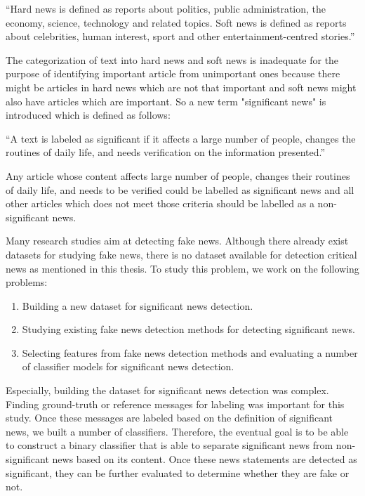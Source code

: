 \enquote{Hard news is defined as reports about politics, public administration, the economy, science, technology and related topics. Soft news is defined as reports about celebrities, human interest, sport and other entertainment-centred stories.}

The categorization of text into hard news and soft news is inadequate for the purpose of identifying important article from unimportant ones because there might be articles in hard news which are not that important and soft news might also have articles which are important. So a new term "significant news" is introduced which is defined as follows:

\enquote{A text is labeled as significant if it affects a large number of people, changes the routines of daily life, and needs verification on the information presented.}

Any article whose content affects large number of people, changes their routines of daily life, and needs to be verified could be labelled as significant news and all other articles which does not meet those criteria should be labelled as a non-significant news. 

Many research studies aim at detecting fake news. Although there already exist datasets for studying fake news, there is no dataset available for detection critical news as mentioned in this thesis. To study this problem, we work on the following problems:

\begin{enumerate}
    \item Building a new dataset for significant news detection.
    \item Studying existing fake news detection methods for detecting significant news.
    \item Selecting features from fake news detection methods and evaluating a number of classifier models for significant news detection.
\end{enumerate}

Especially, building the dataset for significant news detection was complex. Finding ground-truth or reference messages for labeling was important for this study. Once these messages are labeled based on the definition of significant news, we built a number of classifiers. Therefore, the eventual goal is to be able to construct a binary classifier that is able to separate significant news from non-significant news based on its content. Once these news statements are detected as significant, they can be further evaluated to determine whether they are fake or not.

